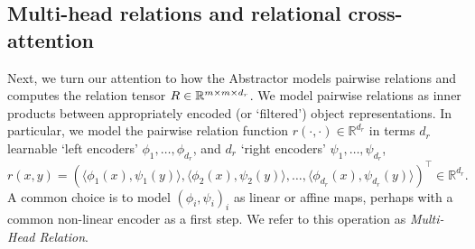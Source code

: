 %
%
%
%
%



\subsection{Multi-head relations and relational cross-attention}

Next, we turn our attention to how the Abstractor models pairwise relations and computes the relation tensor $R \in \mathbb{R}^{m \times m \times d_r}$. We model pairwise relations as inner products between appropriately encoded (or `filtered') object representations. In particular, we model the pairwise relation function $r(\cdot, \cdot) \in \mathbb{R}^{d_r}$ in terms $d_r$ learnable `left encoders' $\phi_1, \ldots, \phi_{d_r}$, and $d_r$ `right encoders' $\psi_1, \ldots, \psi_{d_r}$,
\begin{equation}\label{eq:multi_head_rel}
    r(x,y) = \left(\langle \phi_1(x), \psi_1(y) \rangle, \langle \phi_2(x), \psi_2(y) \rangle, \ldots, \langle \phi_{d_r}(x), \psi_{d_r}(y) \rangle \right)^\top \in \mathbb{R}^{d_r}.
\end{equation}
A common choice is to model $(\phi_i, \psi_i)_i$ as linear or affine maps, perhaps with a common non-linear encoder as a first step. We refer to this operation as \textit{Multi-Head Relation}.

